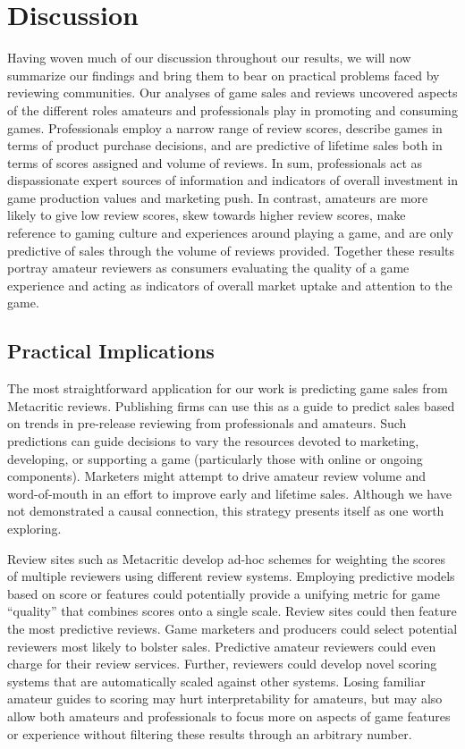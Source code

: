 \documentclass{sig-alternate}
\begin{document}
\section{Discussion}
Having woven much of our discussion throughout our results, we will
now summarize our findings and bring them to bear on practical problems
faced by reviewing communities. Our analyses of game sales and reviews uncovered aspects of the different roles amateurs and professionals play in promoting and consuming games. Professionals employ a narrow range of review scores, describe games in terms of product purchase decisions, and are predictive of lifetime sales both in terms of scores assigned and volume of reviews. In sum, professionals act as dispassionate expert sources of information and indicators of overall investment in game production values and marketing push. In contrast, amateurs are more likely to give low review scores, skew towards higher review scores, make reference to gaming culture and experiences around playing a game, and are only predictive of sales through the volume of reviews provided. Together these results portray amateur reviewers as consumers evaluating the quality of a game experience and acting as indicators of overall market uptake and attention to the game.


\subsection{Practical Implications}
The most straightforward application for our work is predicting game sales from Metacritic reviews. Publishing firms can use this as a guide to predict sales based on trends in pre-release reviewing from professionals and amateurs. Such predictions can guide decisions to vary the resources devoted to marketing, developing, or supporting a game (particularly those with online or ongoing components). Marketers might attempt to drive amateur review volume and word-of-mouth in an effort to improve early and lifetime sales. Although we have not demonstrated a causal connection, this strategy presents itself as one worth exploring.

Review sites such as Metacritic develop ad-hoc schemes for weighting the scores of multiple reviewers using different review systems. Employing predictive models based on score or features could potentially provide a unifying metric for game ``quality'' that combines scores onto a single scale. Review sites could then feature the most predictive reviews. Game marketers and producers could select potential reviewers most likely to bolster sales. Predictive amateur reviewers could even charge for their review services. Further, reviewers could develop novel scoring systems that are automatically scaled against other systems. Losing familiar amateur guides to scoring may hurt interpretability for amateurs, but may also allow both amateurs and professionals to focus more on aspects of game features or experience without filtering these results through an arbitrary number.
\end{document}
